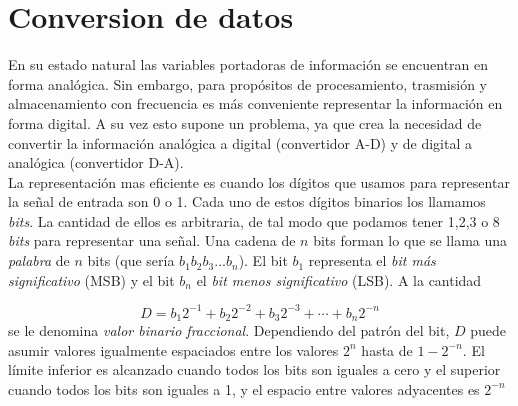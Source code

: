 \documentclass[12pt,a4paper]{article}
\numberwithin{equation}{section}
\numberwithin{figure}{section}
\begin{document}
\newpage

\section{Conversion de datos }

En su estado natural las variables portadoras de información se encuentran en forma analógica. Sin embargo, para propósitos de procesamiento, trasmisión y almacenamiento con frecuencia es más conveniente representar la información en forma digital. A su vez esto supone un problema, ya que crea la necesidad de convertir la información analógica a digital (convertidor A-D) y de digital a analógica (convertidor D-A). \\



La representación mas eficiente es cuando los dígitos que usamos para representar la señal de entrada son 0 o 1. Cada uno de estos dígitos binarios los llamamos \textit{bits}. La cantidad de ellos es arbitraria, de tal modo que podamos tener 1,2,3 o 8 \textit{bits} para representar una señal. Una cadena de $n$ bits forman lo que se llama una \textit{palabra} de $n$ bits (que sería $b_1b_2b_3...b_n$). El bit $b_1$ representa el \textit{bit más significativo} (MSB) y el bit $b_n$ el \textit{bit menos significativo} (LSB). A la cantidad 

\begin{equation}
D = b_1 2^{-1} + b_2 2^{-2} + b_3 2^{-3} + \cdots + b_n 2^{-n}
\end{equation}
se le denomina \textit{valor binario fraccional}. Dependiendo del patrón del bit, $D$ puede asumir valores igualmente espaciados entre los valores $2^n$ hasta de $1-2^{-n}$. El límite inferior es alcanzado cuando todos los bits son iguales a cero y el superior cuando todos los bits son iguales a 1, y el espacio entre valores adyacentes es $2^{-n}$
\end{document}
